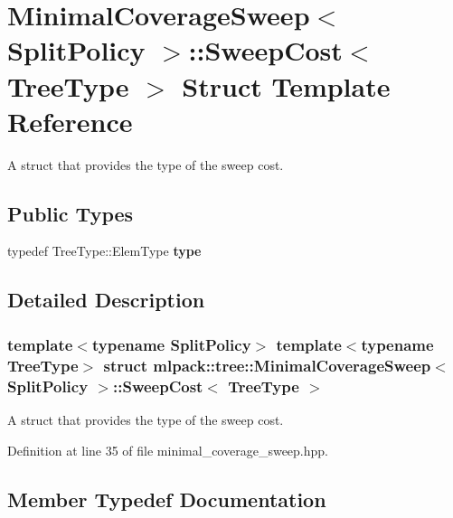 \section{Minimal\+Coverage\+Sweep$<$ Split\+Policy $>$\+:\+:Sweep\+Cost$<$ Tree\+Type $>$ Struct Template Reference}
\label{structmlpack_1_1tree_1_1MinimalCoverageSweep_1_1SweepCost}


A struct that provides the type of the sweep cost.  


\subsection*{Public Types}
\begin{DoxyCompactItemize}
\item 
typedef Tree\+Type\+::\+Elem\+Type \textbf{ type}
\end{DoxyCompactItemize}


\subsection{Detailed Description}
\subsubsection*{template$<$typename Split\+Policy$>$\newline
template$<$typename Tree\+Type$>$\newline
struct mlpack\+::tree\+::\+Minimal\+Coverage\+Sweep$<$ Split\+Policy $>$\+::\+Sweep\+Cost$<$ Tree\+Type $>$}

A struct that provides the type of the sweep cost. 

Definition at line 35 of file minimal\+\_\+coverage\+\_\+sweep.\+hpp.



\subsection{Member Typedef Documentation}
\mbox{\label{structmlpack_1_1tree_1_1MinimalCoverageSweep_1_1SweepCost_aaa624f9684a37eb72ad838b6bcb54dfb}} 
